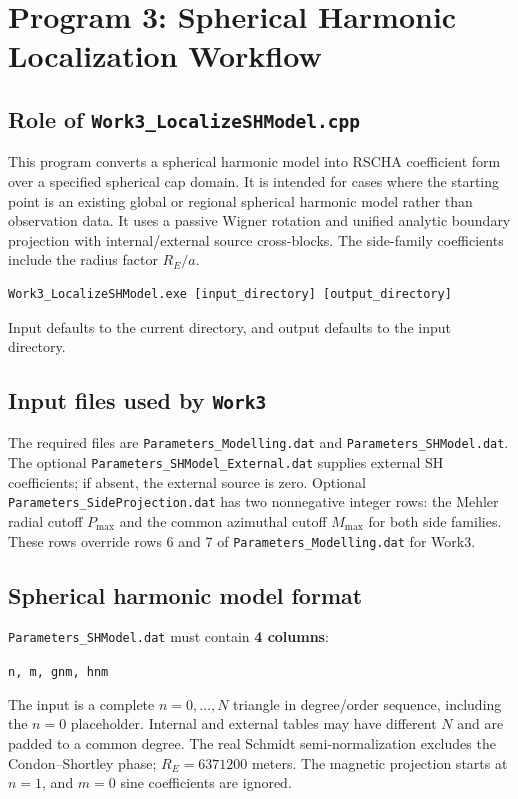 \documentclass[11pt,a4paper]{article}
\begin{document}
\section{Program 3: Spherical Harmonic Localization Workflow}

\subsection{Role of \texttt{Work3\_LocalizeSHModel.cpp}}

This program converts a spherical harmonic model into RSCHA coefficient form over a specified spherical cap domain. It is intended for cases where the starting point is an existing global or regional spherical harmonic model rather than observation data. It uses a passive Wigner rotation and unified analytic boundary projection with internal/external source cross-blocks. The side-family coefficients include the radius factor $R_E/a$.

\begin{lstlisting}[style=plaincode]
Work3_LocalizeSHModel.exe [input_directory] [output_directory]
\end{lstlisting}
Input defaults to the current directory, and output defaults to the input directory.

\subsection{Input files used by \texttt{Work3}}

The required files are \texttt{Parameters\_Modelling.dat} and
\texttt{Parameters\_SHModel.dat}. The optional
\texttt{Parameters\_SHModel\_External.dat} supplies external SH coefficients;
if absent, the external source is zero. Optional
\texttt{Parameters\_SideProjection.dat} has two nonnegative integer rows:
the Mehler radial cutoff $P_{\max}$ and the common azimuthal cutoff
$M_{\max}$ for both side families. These rows override rows 6 and 7 of
\texttt{Parameters\_Modelling.dat} for Work3.

\subsection{Spherical harmonic model format}

\texttt{Parameters\_SHModel.dat} must contain \textbf{4 columns}:
\begin{center}
\texttt{n, m, gnm, hnm}
\end{center}

The input is a complete $n=0,\ldots,N$ triangle in degree/order sequence, including the $n=0$ placeholder. Internal and external tables may have different $N$ and are padded to a common degree. The real Schmidt semi-normalization excludes the Condon--Shortley phase; $R_E=6371200$ meters. The magnetic projection starts at $n=1$, and $m=0$ sine coefficients are ignored.
\end{document}
